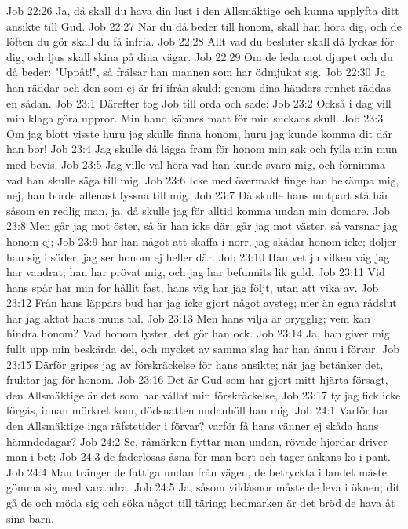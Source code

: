 Job 22:26  Ja, då skall du hava din lust i den Allsmäktige och kunna upplyfta ditt ansikte till Gud.
Job 22:27  När du då beder till honom, skall han höra dig, och de löften du gör skall du få infria.
Job 22:28  Allt vad du besluter skall då lyckas för dig, och ljus skall skina på dina vägar.
Job 22:29  Om de leda mot djupet och du då beder: "Uppåt!", så frälsar han mannen som har ödmjukat sig.
Job 22:30  Ja han räddar och den som ej är fri ifrån skuld; genom dina händers renhet räddas en sådan.
Job 23:1  Därefter tog Job till orda och sade:
Job 23:2  Också i dag vill min klaga göra uppror. Min hand kännes matt för min suckans skull.
Job 23:3  Om jag blott visste huru jag skulle finna honom, huru jag kunde komma dit där han bor!
Job 23:4  Jag skulle då lägga fram för honom min sak och fylla min mun med bevis.
Job 23:5  Jag ville väl höra vad han kunde svara mig, och förnimma vad han skulle säga till mig.
Job 23:6  Icke med övermakt finge han bekämpa mig, nej, han borde allenast lyssna till mig.
Job 23:7  Då skulle hans motpart stå här såsom en redlig man, ja, då skulle jag för alltid komma undan min domare.
Job 23:8  Men går jag mot öster, så är han icke där; går jag mot väster, så varsnar jag honom ej;
Job 23:9  har han något att skaffa i norr, jag skådar honom icke; döljer han sig i söder, jag ser honom ej heller där.
Job 23:10  Han vet ju vilken väg jag har vandrat; han har prövat mig, och jag har befunnits lik guld.
Job 23:11  Vid hans spår har min for hållit fast, hans väg har jag följt, utan att vika av.
Job 23:12  Från hans läppars bud har jag icke gjort något avsteg; mer än egna rådslut har jag aktat hans muns tal.
Job 23:13  Men hans vilja är orygglig; vem kan hindra honom? Vad honom lyster, det gör han ock.
Job 23:14  Ja, han giver mig fullt upp min beskärda del, och mycket av samma slag har han ännu i förvar.
Job 23:15  Därför gripes jag av förskräckelse för hans ansikte; när jag betänker det, fruktar jag för honom.
Job 23:16  Det är Gud som har gjort mitt hjärta försagt, den Allsmäktige är det som har vållat min förskräckelse,
Job 23:17  ty jag fick icke förgås, innan mörkret kom, dödsnatten undanhöll han mig.
Job 24:1  Varför har den Allsmäktige inga räfstetider i förvar? varför få hans vänner ej skåda hans hämndedagar?
Job 24:2  Se, råmärken flyttar man undan, rövade hjordar driver man i bet;
Job 24:3  de faderlösas åsna för man bort och tager änkans ko i pant.
Job 24:4  Man tränger de fattiga undan från vägen, de betryckta i landet måste gömma sig med varandra.
Job 24:5  Ja, såsom vildåsnor måste de leva i öknen; dit gå de och möda sig och söka något till täring; hedmarken är det bröd de hava åt sina barn.
